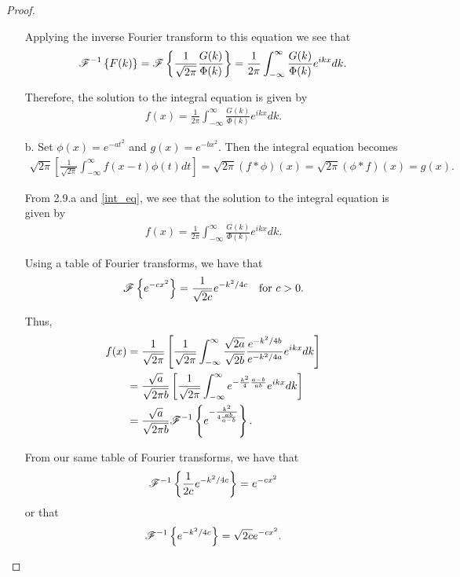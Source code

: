 \begin{proof}
\begin{enumerate}
      Applying the inverse Fourier transform to this equation we see that
      \begin{align*}
        \mathscr{F}^{-1}\left\{ {F(k)} \right\} = \mathscr{F}\left\{ {\frac{1}{\sqrt{2\pi}}\frac{G(k)}{\Phi(k)}} \right\}
        = \frac{1}{2\pi} \int_{-\infty}^{\infty}\frac{G(k)}{\Phi(k)}e^{ikx} dk.
      \end{align*}

      Therefore, the solution to the integral equation is given by
      \begin{align}\label{int_eq}
        f(x) = \frac{1}{2\pi} \int_{-\infty}^{\infty}\frac{G(k)}{\Phi(k)}e^{ikx} dk.
      \end{align}

    \item [b.] Set $\phi(x) = e^{-at^2}$ and $g(x) = e^{-bx^2}$. Then
      the integral equation becomes
      \begin{align*}
        \sqrt{2\pi}\left[\frac{1}{\sqrt{2\pi}} \int_{-\infty}^{\infty} f(x-t) \phi(t) dt \right] = \sqrt{2\pi}(f \ast \phi)(x) = \sqrt{2\pi}(\phi \ast f)(x) = g(x).
      \end{align*}

      From 2.9.a and \eqref{int_eq}, we see that the solution to the integral equation is given by
      \begin{align*}
        f(x) = \frac{1}{2\pi} \int_{-\infty}^{\infty}\frac{G(k)}{\Phi(k)}e^{ikx} dk.
      \end{align*}

      Using a table of Fourier transforms, we have that
      \begin{align*}
        \mathscr{F}\left\{ {e^{-cx^2}} \right\} = \frac{1}{\sqrt{2c}} e^{-k^2/4c} \quad \text{for $c > 0$}.
      \end{align*}

      Thus,
      \begin{align*}
        f(x) &= \frac{1}{\sqrt{2\pi}}\left[\frac{1}{\sqrt{2\pi}}\int_{-\infty}^{\infty} \frac{\sqrt{2a}}{\sqrt{2b}}\frac{e^{-k^2/4b}}{e^{-k^2/4a}}e^{ikx}dk\right]\\
        &= \frac{\sqrt{a}}{\sqrt{2\pi b}}\left[ \frac{1}{\sqrt{2\pi}} \int_{-\infty}^{\infty} e^{-\frac{k^2}{4}\frac{a-b}{ab}} e^{ikx} dk\right] \\
        &= \frac{\sqrt{a}}{\sqrt{2\pi b}} \mathscr{F}^{-1}\left\{ {e^{-\frac{k^2}{4\frac{ab}{a-b}}}} \right\}.
      \end{align*}

      From our same table of Fourier transforms, we have that
      \begin{align*}
        \mathscr{F}^{-1}\left\{ {\frac{1}{2c}e^{-k^2/4c}} \right\} = e^{-cx^2}
      \end{align*}
      or that
      \begin{align*}
        \mathscr{F}^{-1}\left\{ {e^{-k^2/4c}} \right\} = \sqrt{2c} e^{-c x^2}.
      \end{align*}


\end{enumerate}
\end{proof}
